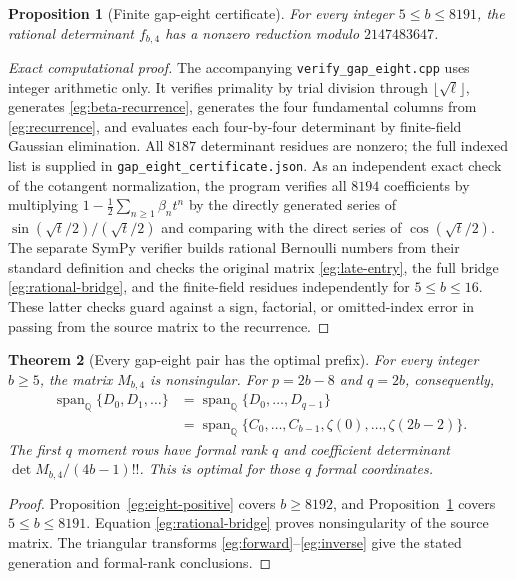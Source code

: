 \documentclass[11pt,a4paper]{article}
\numberwithin{equation}{section}
\newtheorem{theorem}{Theorem}[section]
\newtheorem{proposition}[theorem]{Proposition}
\theoremstyle{definition}
\theoremstyle{remark}
\begin{document}
\begin{proposition}[Finite gap-eight certificate]
\label{eg:eight-finite}
For every integer $5\le b\le8191$, the rational determinant
$f_{b,4}$ has a nonzero reduction modulo $2147483647$.
\end{proposition}

\begin{proof}[Exact computational proof]
The accompanying \texttt{verify\_gap\_eight.cpp} uses integer
arithmetic only.  It verifies primality by trial division through
$\lfloor\sqrt\ell\rfloor$, generates \eqref{eg:beta-recurrence},
generates the four fundamental columns from \eqref{eg:recurrence},
and evaluates each four-by-four determinant by finite-field Gaussian
elimination.  All $8187$ determinant residues are nonzero; the full
indexed list is supplied in \texttt{gap\_eight\_certificate.json}.
As an independent exact check of the cotangent normalization, the
program verifies all $8194$ coefficients by multiplying
$1-\tfrac12\sum_{n\ge1}\beta_nt^n$ by the directly generated
series of $\sin(\sqrt t/2)/(\sqrt t/2)$ and comparing with the
direct series of $\cos(\sqrt t/2)$.
The separate SymPy verifier builds rational Bernoulli numbers from
their standard definition and checks the original matrix
\eqref{eg:late-entry}, the full bridge \eqref{eg:rational-bridge},
and the finite-field residues independently for $5\le b\le16$.
These latter checks guard against a sign, factorial, or omitted-index
error in passing from the source matrix to the recurrence.
\end{proof}

\begin{theorem}[Every gap-eight pair has the optimal prefix]
\label{eg:eight-main}
For every integer $b\ge5$, the matrix $M_{b,4}$ is nonsingular.
For $p=2b-8$ and $q=2b$, consequently,
\begin{align*}
 \operatorname{span}_{\mathbb Q}\{D_0,D_1,\ldots\}
 &=\operatorname{span}_{\mathbb Q}\{D_0,\ldots,D_{q-1}\}\\
 &=\operatorname{span}_{\mathbb Q}
       \{C_0,\ldots,C_{b-1},\zeta(0),\ldots,\zeta(2b-2)\}.
\end{align*}
The first $q$ moment rows have formal rank $q$ and coefficient
determinant $\det M_{b,4}/(4b-1)!!$.  This is optimal for those
$q$ formal coordinates.
\end{theorem}

\begin{proof}
Proposition~\ref{eg:eight-positive} covers $b\ge8192$, and
Proposition~\ref{eg:eight-finite} covers $5\le b\le8191$.
Equation \eqref{eg:rational-bridge} proves nonsingularity of the
source matrix.  The triangular transforms
\eqref{eg:forward}--\eqref{eg:inverse} give the stated generation
and formal-rank conclusions.
\end{proof}
\end{document}
